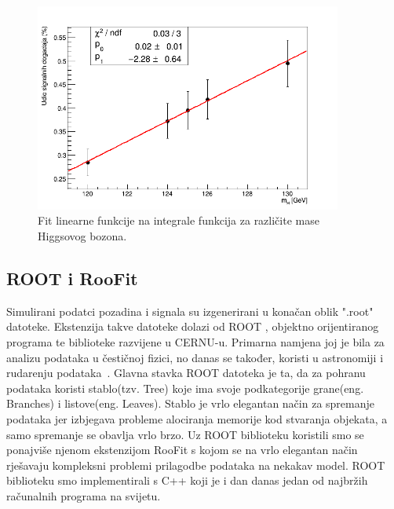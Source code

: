 \documentclass[12pt,a4paper,oneside]{article}
\begin{document}
\begin{linenumbers}
		\begin{figure}[H]
			\centering
			\includegraphics[width=0.9\textwidth]{fit-integrali-19-8.png}
			\caption[Fit linearne funkcije na integrale funkcija za različite mase Higgsovog bozona.]{\label{sl:sl6} Fit linearne funkcije na integrale funkcija za različite mase Higgsovog bozona.}
		\end{figure}
		
		
		\subsection{ROOT i RooFit}
		Simulirani podatci pozadina i signala su izgenerirani u konačan oblik ".root" datoteke. Ekstenzija takve datoteke dolazi od ROOT , objektno orijentiranog programa te biblioteke razvijene u CERNU-u. Primarna namjena joj je bila za analizu podataka u čestičnoj fizici, no danas se također, koristi u astronomiji i rudarenju podataka~\cite{roofit}. Glavna stavka ROOT datoteka je ta, da za pohranu podataka koristi stablo(tzv. Tree) koje ima svoje podkategorije grane(eng. Branches) i listove(eng. Leaves).  Stablo je vrlo elegantan način za spremanje podataka jer izbjegava probleme alociranja memorije kod stvaranja objekata, a samo spremanje se obavlja vrlo brzo. 
		Uz ROOT biblioteku koristili smo se ponajviše njenom ekstenzijom RooFit s kojom se na vrlo elegantan način rješavaju kompleksni problemi prilagodbe podataka na nekakav model. ROOT biblioteku smo implementirali s C++ koji je i dan danas jedan od najbržih računalnih programa na svijetu.
		

\end{linenumbers}
\end{document}
